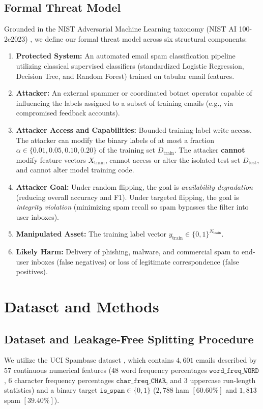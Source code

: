 \documentclass[10pt,conference]{IEEEtran}
\begin{document}
\subsection{Formal Threat Model}
Grounded in the NIST Adversarial Machine Learning taxonomy (NIST AI 100-2e2023) \cite{nist2024adversarial}, we define our formal threat model across six structural components:
\begin{enumerate}
    \item \textbf{Protected System:} An automated email spam classification pipeline utilizing classical supervised classifiers (standardized Logistic Regression, Decision Tree, and Random Forest) trained on tabular email features.
    \item \textbf{Attacker:} An external spammer or coordinated botnet operator capable of influencing the labels assigned to a subset of training emails (e.g., via compromised feedback accounts).
    \item \textbf{Attacker Access and Capabilities:} Bounded training-label write access. The attacker can modify the binary labels of at most a fraction $\alpha \in \{0.01, 0.05, 0.10, 0.20\}$ of the training set $D_{\text{train}}$. The attacker \textbf{cannot} modify feature vectors $X_{\text{train}}$, cannot access or alter the isolated test set $D_{\text{test}}$, and cannot alter model training code.
    \item \textbf{Attacker Goal:} Under random flipping, the goal is \textit{availability degradation} (reducing overall accuracy and F1). Under targeted flipping, the goal is \textit{integrity violation} (minimizing spam recall so spam bypasses the filter into user inboxes).
    \item \textbf{Manipulated Asset:} The training label vector $y_{\text{train}} \in \{0, 1\}^{N_{\text{train}}}$.
    \item \textbf{Likely Harm:} Delivery of phishing, malware, and commercial spam to end-user inboxes (false negatives) or loss of legitimate correspondence (false positives).
\end{enumerate}

\section{Dataset and Methods}

\subsection{Dataset and Leakage-Free Splitting Procedure}
We utilize the UCI Spambase dataset \cite{hopkins1999spambase}, which contains $4,601$ emails described by $57$ continuous numerical features ($48$ word frequency percentages $\mathtt{word\_freq\_WORD}$, $6$ character frequency percentages $\mathtt{char\_freq\_CHAR}$, and $3$ uppercase run-length statistics) and a binary target $\mathtt{is\_spam} \in \{0, 1\}$ ($2,788$ ham $[60.60\%]$ and $1,813$ spam $[39.40\%]$).
\end{document}

